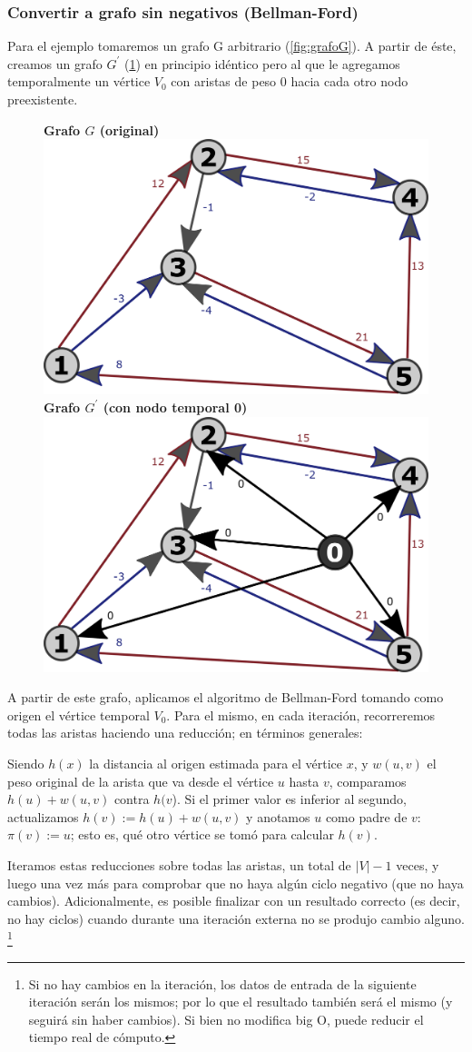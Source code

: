 \documentclass[../tp2_grupo404.tex]{subfiles}
\begin{document}
\subsubsection{Convertir a grafo sin negativos (Bellman-Ford)}
Para el ejemplo tomaremos un grafo G arbitrario (\cref{fig:grafoG}).
A partir de éste, creamos un grafo $G^\prime$ (\cref{fig:grafoG_prima})
en principio idéntico pero al que le agregamos temporalmente un
vértice $V_0$ con aristas de peso $0$ hacia cada otro nodo preexistente.

\begin{figure}[H]
    \centering
    \subcaptionbox
        {\label{fig:grafoG}\textbf{Grafo $G$ (original)}}
        {\includegraphics[width=0.4\linewidth,angle=0,origin=c]{out/ford/ford1A.png}}
    \subcaptionbox
        {\label{fig:grafoG_prima}\textbf{Grafo $G^\prime$ (con nodo temporal 0)}}
        {\includegraphics[width=0.4\linewidth,angle=0,origin=c]{out/ford/ford1B.png}}
\end{figure}

A partir de este grafo, aplicamos el algoritmo de Bellman-Ford tomando
como origen el vértice temporal $V_0$. Para el mismo, en cada iteración,
recorreremos todas las aristas haciendo una reducción;
en términos generales:
\begin{displayquote}
Siendo $h(x)$ la distancia al origen estimada para el vértice $x$,
y $w(u,v)$ el peso original de la arista que va desde el vértice $u$ hasta $v$,
comparamos $h(u)+w(u,v)$ contra $h(v$). Si el primer valor es inferior al
segundo, actualizamos $h(v) := h(u)+w(u,v)$ y anotamos $u$ como padre de $v$:
$\pi(v):=u$; esto es, qué otro vértice se tomó para calcular $h(v)$.
\end{displayquote}

Iteramos estas reducciones sobre todas las aristas, un total de
$\lvert V \rvert-1$ veces, y luego una vez más para comprobar que
no haya algún ciclo negativo (que no haya cambios). Adicionalmente,
es posible finalizar con un resultado correcto (es decir, no hay ciclos)
cuando durante una iteración externa no se produjo cambio alguno.
\footnote{Si no hay cambios en la iteración, los datos de entrada de
la siguiente iteración serán los mismos; por lo que el resultado también
será el mismo (y seguirá sin haber cambios). Si bien no modifica
big O, puede reducir el tiempo real de cómputo.}
\end{document}
